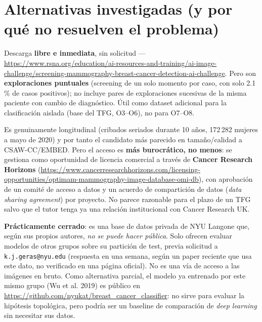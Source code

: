 \documentclass[11pt,a4paper]{article}
\begin{document}
\section{Alternativas investigadas (y por qué no resuelven el problema)}
\label{sec:alternativas}

\begin{description}[leftmargin=0cm,style=nextline]
  \item[RSNA Screening Mammography Breast Cancer Detection (Kaggle, 2023)]
        Descarga \textbf{libre e inmediata}, sin solicitud ---
        \url{https://www.rsna.org/education/ai-resources-and-training/ai-image-challenge/screening-mammography-breast-cancer-detection-ai-challenge}.
        Pero son \textbf{exploraciones puntuales} (screening de un solo
        momento por caso, con solo 2.1\,\% de casos positivos); no incluye
        pares de exploraciones sucesivas de la misma paciente con cambio de
        diagnóstico. Útil como dataset adicional para la clasificación
        aislada (base del TFG, O3--O6), no para O7--O8.

  \item[OPTIMAM / OMI-DB (Cancer Research UK + Royal Surrey NHS)]
        Es genuinamente longitudinal (cribados seriados durante 10 años,
        172\,282 mujeres a mayo de 2020) y por tanto el candidato más
        parecido en tamaño/calidad a CSAW-CC/EMBED. Pero el acceso es
        \textbf{más burocrático, no menos}: se gestiona como oportunidad de
        licencia comercial a través de \textbf{Cancer Research Horizons}
        (\url{https://www.cancerresearchhorizons.com/licensing-opportunities/optimam-mammography-image-database-omi-db}),
        con aprobación de un comité de acceso a datos y un acuerdo de
        compartición de datos (\textit{data sharing agreement}) por
        proyecto. No parece razonable para el plazo de un TFG salvo que el
        tutor tenga ya una relación institucional con Cancer Research UK.

  \item[NYU Breast Cancer Screening Dataset (NYU Langone)]
        \textbf{Prácticamente cerrado}: es una base de datos privada de NYU
        Langone que, según sus propios autores, \emph{no se puede hacer
        pública}. Solo ofrecen evaluar modelos de otros grupos sobre su
        partición de test, previa solicitud a
        \texttt{k.j.geras@nyu.edu} (respuesta en una semana, según un
        paper reciente que usa este dato, no verificado en una página
        oficial). No es una vía de acceso a las imágenes en bruto. Como
        alternativa parcial, el modelo ya entrenado por este mismo grupo
        (Wu et al. 2019) es público en
        \url{https://github.com/nyukat/breast_cancer_classifier}: no sirve
        para evaluar la hipótesis topológica, pero podría ser un baseline
        de comparación de \textit{deep learning} sin necesitar sus datos.


\end{description}
\end{document}
